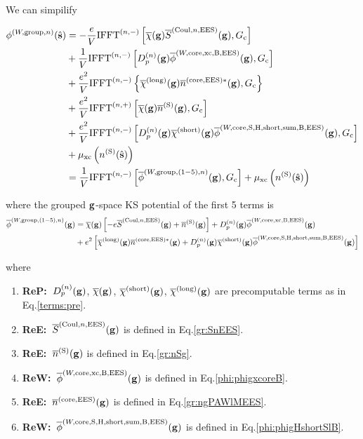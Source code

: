 \documentclass[paper=a4, fontsize=11pt]{article} %
\numberwithin{equation}{section} %
\numberwithin{figure}{section} %
\numberwithin{table}{section} %
\newcommand{\ol}{\overline}
\newcommand{\bs}{{\bf{s}}}
\newcommand{\bg}{{\bf{g}}}
\newcommand{\hs}{{\hat{\bf{s}}}}
\newcommand{\rS}{{\mathrm{S}}}
\newcommand{\rEES}{{\mathrm{EES}}}
\newcommand{\rxc}{{\mathrm{xc}}}
\newcommand{\rgr}{{\mathrm{group}}}
\newcommand{\rcore}{{\mathrm{core}}}
\newcommand{\rCo}{{\mathrm{Coul}}}
\newcommand{\rshort}{{\mathrm{short}}}
\newcommand{\rlong}{{\mathrm{long}}}
\newcommand{\rH}{{\mathrm{H}}}
\newcommand{\rB}{{\mathrm{B}}}
\newcommand{\rsum}{{\mathrm{sum}}}
\newcommand{\Gc}{{G_{\mathrm{c}}}}
\newcommand{\Dng}{{D^{(n)}_p(\bg)}}
\newcommand{\IFFTn}{{\mathrm{IFFT}^{(n,+)}}}
\newcommand{\IFFTni}{{\mathrm{IFFT}^{(n,-)}}}
\newcommand{\ReE}{{{\bf ReE:\ }}}
\newcommand{\ReW}{{{\bf ReW:\ }}}
\newcommand{\ReP}{{{\bf ReP:\ }}}
\begin{document}
We can simpilify 

\begin{equation}\label{gr:groupedphin}
\begin{split}
\phi^{(W,\rgr,n)}(\hs)
&= -\frac{e}{V} \IFFTni \left[\ol \chi(\bg) \ol S^{(\rCo,n,\rEES)}(\bg), \Gc \right] \\
&+ \frac{1}{V} \IFFTni \left[ \Dng \ol \phi^{(W,\rcore,\rxc,\rB,\rEES)}(\bg),\Gc\right] \\
&+ \frac{e^2}{V} \IFFTni \left\{ \ol \chi^{(\rlong)} (\bg) \ol{n}^{(\rcore,\rEES)*}(\bg),\Gc\right\} \\
&+ \frac{e^2}{V} \IFFTn \left[\ol \chi(\bg) \ol{n}^{(\rS)}(\bg),\Gc \right]\\
&+ \frac{e^2}{V} \IFFTni \left[\Dng \ol \chi^{(\rshort)}(\bg) \ol \phi^{(W,\rcore,\rS,\rH,\rshort,\rsum,\rB,\rEES)}(\bg) ,\Gc\right]\\
&+ \mu_{\rxc}\left(n^{(\rS)}(\hat \bs)\right) \\
&= \frac{1}{V} \IFFTni \left[\ol \phi^{(W,\rgr,(1-5),n)}(\bg) ,\Gc\right] + \mu_{\rxc}\left(n^{(\rS)}(\hat \bs)\right)\\
\end{split}
\end{equation}

where the grouped $\bg$-space KS potential of the first 5 terms is
\begin{equation}
\begin{split}
\ol \phi^{(W,\rgr,(1-5),n)}(\bg)
&= \ol \chi(\bg) \left[-e\ol S^{(\rCo,n,\rEES)}(\bg) + \overline{n}^{(\rS)}(\bg)\right] + \Dng \ol \phi^{(W,\rcore,\rxc,\rB,\rEES)}(\bg) \\
&+ e^2\left[ \ol \chi^{(\rlong)} (\bg) \ol{n}^{(\rcore,\rEES)*}(\bg) + \Dng \ol \chi^{(\rshort)}(\bg) \ol \phi^{(W,\rcore,\rS,\rH,\rshort,\rsum,\rB,\rEES)}(\bg)\right]
\end{split}
\end{equation}

where
\begin{enumerate}
\item \ReP $\Dng$, $\ol \chi(\bg)$, $\ol \chi^{(\rshort)}(\bg)$, $\ol \chi^{(\rlong)}(\bg)$ are precomputable terms as in Eq.\eqref{terms:pre}.
\item \ReE $\ol S^{(\rCo,n,\rEES)}(\bg)$ is defined in Eq.\eqref{gr:SnEES}.
\item \ReE $\overline{n}^{(\rS)}(\bg) $ is defined in Eq.\eqref{gr:nSg}.
\item \ReW $\ol \phi^{(W,\rcore,\rxc,\rB,\rEES)}(\bg)$ is defined in Eq.\eqref{phi:phigxcoreB}.
\item \ReE $\ol{n}^{(\rcore,\rEES)}(\bg)$ is defined in Eq.\eqref{gr:ngPAWlMEES}.
\item \ReW $\ol \phi^{(W,\rcore,\rS,\rH,\rshort,\rsum,\rB,\rEES)}(\bg)$ is defined in Eq.\eqref{phi:phigHshortSlB}.
\end{enumerate}
\end{document}

